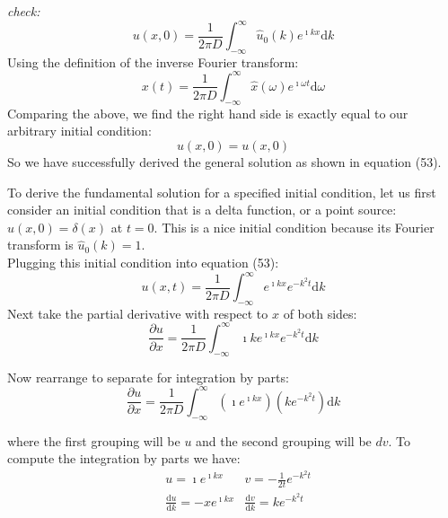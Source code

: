 \documentclass[draft, jgrga]{AGUTeX}
\begin{document}
\begin{article}
\textit{check:}
\begin{equation}
u(x,0) = \frac{1}{2 \pi D} \int^\infty_{-\infty} \hat{u}_0 (k) e^{\imath kx} \mathrm{d}k \nonumber
\end{equation}
Using the definition of the inverse Fourier transform:
\begin{equation}
x(t) = \frac{1}{2 \pi D} \int^\infty_{-\infty} \hat{x} (\omega) e^{\imath \omega t} \mathrm{d}\omega \nonumber
\end{equation}
Comparing the above, we find the right hand side is exactly equal to our arbitrary initial condition:
\begin{equation}
u(x,0) = u(x,0) \nonumber
\end{equation}
So we have successfully derived the general solution as shown in equation (53).

To derive the fundamental solution for a specified initial condition, let us first consider an initial condition that is a delta function, or a point source: \begin{math} u(x,0) = \delta (x) \end{math} at \begin{math} t=0 \end{math}. This is a nice initial condition because its Fourier transform is \begin{math} \hat{u}_0 (k) = 1 \end{math}.\\
Plugging this initial condition into equation (53):
\begin{equation}
u(x,t) = \frac{1}{2 \pi D} \int^\infty_{-\infty} e^{\imath kx} e^{-k^2t} \mathrm{d}k
\end{equation}
Next take the partial derivative with respect to $x$ of both sides:
\begin{equation}
\frac{\partial u}{\partial x} = \frac {1}{2 \pi D}
\int^\infty_{-\infty} \imath k e^{\imath kx} e^{-k^2t} \mathrm{d}k
\end{equation}

Now rearrange to separate for integration by parts:
\begin{equation}
\frac{\partial u}{\partial x} = \frac {1}{2 \pi D}
\int^\infty_{-\infty} \left( \imath e^{\imath kx} \right) \left(k e^{-k^2t} \right) \mathrm{d}k
\end{equation}

where the first grouping will be \begin{math} u \end{math} and the second grouping will be \begin{math} dv \end{math}. To compute the integration by parts we have:
\begin{eqnarray}
& u = \imath e^{\imath kx} & v=-\frac{1}{2t} e^{-k^2t} \nonumber \\
& \frac{\mathrm{d}u}{\mathrm{d}k} = - xe^{\imath kx} & \frac{\mathrm{d}v}{\mathrm{d}k} = k e^{-k^2t} \nonumber
\end{eqnarray}


\end{article}
\end{document}
